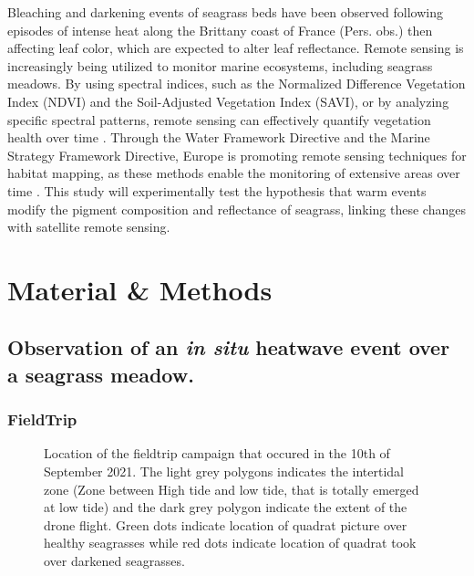 \documentclass[
  number]{elsarticle}
\begin{document}
Bleaching and darkening events of seagrass beds have been observed
following episodes of intense heat along the Brittany coast of France
(Pers. obs.) then affecting leaf color, which are expected to alter leaf
reflectance. Remote sensing is increasingly being utilized to monitor
marine ecosystems, including seagrass meadows. By using spectral
indices, such as the Normalized Difference Vegetation Index (NDVI) and
the Soil-Adjusted Vegetation Index (SAVI), or by analyzing specific
spectral patterns, remote sensing can effectively quantify vegetation
health over time
\citep{huete2012vegetation, kloos2021agricultural, carlan2020identifying, akbar2020mangrove}.
Through the Water Framework Directive and the Marine Strategy Framework
Directive, Europe is promoting remote sensing techniques for habitat
mapping, as these methods enable the monitoring of extensive areas over
time \citep{papathanasopoulou2019satellite}. This study will
experimentally test the hypothesis that warm events modify the pigment
composition and reflectance of seagrass, linking these changes with
satellite remote sensing.

\section{Material \& Methods}\label{material-methods}

\subsection{\texorpdfstring{Observation of an \emph{in situ} heatwave
event over a seagrass
meadow.}{Observation of an in situ heatwave event over a seagrass meadow.}}\label{observation-of-an-in-situ-heatwave-event-over-a-seagrass-meadow.}

\subsubsection{FieldTrip}\label{fieldtrip}

\label{cell-fig-quiberonMap}
\begin{figure}[H]


\caption{\label{fig-quiberonMap}Location of the fieldtrip campaign that
occured in the 10th of September 2021. The light grey polygons indicates
the intertidal zone (Zone between High tide and low tide, that is
totally emerged at low tide) and the dark grey polygon indicate the
extent of the drone flight. Green dots indicate location of quadrat
picture over healthy seagrasses while red dots indicate location of
quadrat took over darkened seagrasses.}

\end{figure}%
\end{document}
